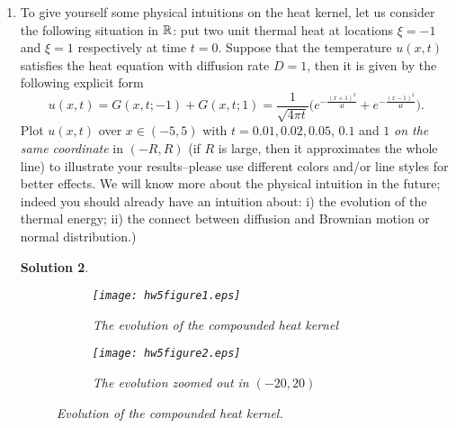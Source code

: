 \documentclass[6pt]{article}
\newtheorem{solution}{Solution}
\numberwithin{equation}{section}
\def\mathbb{\Bbb}
\begin{document}
\begin{enumerate}
(iii) $\int_{\mathbb R}G(x,t;\xi)dx=1$.

Remark:  I would like to note that we write the kernel $G(x,t;\xi)$ and $G(\xi;x,t)$ interchangeably.  The former is to highlight the eventual solution as a function of $x$ and $t$, whereas the latter is to focus on treating $\xi$ as the integration variable whenever applicable.
\begin{solution}
All the conclusions above can be verified through straightforward calculations and I skip typing them here.  I would like to point out that in (i), one should treat both $t$ and $x$ as
fixed parameters.
\end{solution}

\item To give yourself some physical intuitions on the heat kernel, let us consider the following situation in $\mathbb R$: put two unit thermal heat at locations $\xi=-1$ and $\xi=1$ respectively at time $t=0$.  Suppose that the temperature $u(x,t)$ satisfies the heat equation with diffusion rate $D=1$, then it is given by the following explicit form
    \[u(x,t)=G(x,t;-1)+G(x,t;1)=\frac{1}{\sqrt{4\pi t}}\Big(e^{-\frac{(x+1)^2}{4t}}+e^{-\frac{(x-1)^2}{4t}}\Big).\]
Plot $u(x,t)$ over $x\in(-5,5)$ with $t=0.01, 0.02, 0.05$, $0.1$ and $1$ \emph{on the same coordinate} in $(-R,R)$ (if $R$ is large, then it approximates the whole line)  to illustrate your results--please use different colors and/or line styles for better effects.  We will know more about the physical intuition in the future; indeed you should already have an intuition about: i) the evolution of the thermal energy; ii) the connect between diffusion and Brownian motion or normal distribution.)
\begin{solution}
\begin{figure}[h!]
    \centering
    \begin{subfigure}[b]{0.475\textwidth}
        \texttt{[image: hw5figure1.eps]}
        \caption*{The evolution of the compounded heat kernel}
    \end{subfigure}\hspace{5mm}
    \begin{subfigure}[b]{0.475\textwidth}
        \texttt{[image: hw5figure2.eps]}
        \caption*{The evolution zoomed out in $(-20,20)$}
    \end{subfigure}
    \caption{Evolution of the compounded heat kernel.}\label{HK1}
\end{figure}


\end{solution}
\end{enumerate}
\end{document}
